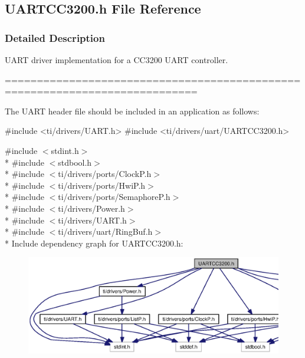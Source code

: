 \subsection{U\+A\+R\+T\+C\+C3200.\+h File Reference}
\label{_u_a_r_t_c_c3200_8h}


\subsubsection{Detailed Description}
U\+A\+R\+T driver implementation for a C\+C3200 U\+A\+R\+T controller. 

============================================================================

The U\+A\+R\+T header file should be included in an application as follows\+: 
\begin{DoxyCode}
\textcolor{preprocessor}{#include <ti/drivers/UART.h>}
\textcolor{preprocessor}{#include <ti/drivers/uart/UARTCC3200.h>}
\end{DoxyCode}
 

{\ttfamily \#include $<$stdint.\+h$>$}\\*
{\ttfamily \#include $<$stdbool.\+h$>$}\\*
{\ttfamily \#include $<$ti/drivers/ports/\+Clock\+P.\+h$>$}\\*
{\ttfamily \#include $<$ti/drivers/ports/\+Hwi\+P.\+h$>$}\\*
{\ttfamily \#include $<$ti/drivers/ports/\+Semaphore\+P.\+h$>$}\\*
{\ttfamily \#include $<$ti/drivers/\+Power.\+h$>$}\\*
{\ttfamily \#include $<$ti/drivers/\+U\+A\+R\+T.\+h$>$}\\*
{\ttfamily \#include $<$ti/drivers/uart/\+Ring\+Buf.\+h$>$}\\*
Include dependency graph for U\+A\+R\+T\+C\+C3200.\+h\+:
\nopagebreak
\begin{figure}[H]
\begin{center}
\leavevmode
\includegraphics[width=350pt]{_u_a_r_t_c_c3200_8h__incl}
\end{center}
\end{figure}
